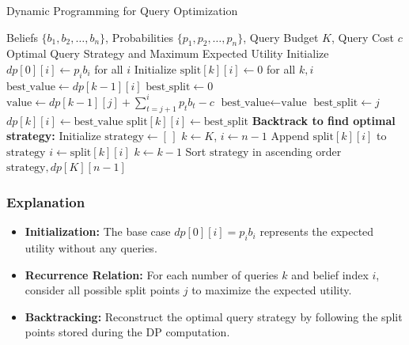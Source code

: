 \documentclass[12pt]{article}
\begin{document}
\begin{algorithm}[H]
\caption{Dynamic Programming for Query Optimization}
\label{alg:query_optimization}
\begin{algorithmic}[1]
\Require Beliefs \( \{b_1, b_2, \dots, b_n\} \), Probabilities \( \{p_1, p_2, \dots, p_n\} \), Query Budget \( K \), Query Cost \( c \)
\Ensure Optimal Query Strategy and Maximum Expected Utility
\State Initialize \( dp[0][i] \gets p_i b_i \) for all \( i \)
\State Initialize \( \text{split}[k][i] \gets 0 \) for all \( k, i \)
        \State \( \text{best\_value} \gets dp[k-1][i] \)
        \State \( \text{best\_split} \gets 0 \)
            \State \( \text{value} \gets dp[k-1][j] + \sum_{t=j+1}^{i} p_t b_t - c \)
                \State \( \text{best\_value} \gets \text{value} \)
                \State \( \text{best\_split} \gets j \)
            \EndIf
        \EndFor
        \State \( dp[k][i] \gets \text{best\_value} \)
        \State \( \text{split}[k][i] \gets \text{best\_split} \)
    \EndFor
\EndFor
\State \textbf{Backtrack to find optimal strategy:}
\State Initialize \( \text{strategy} \gets [\,] \)
\State \( k \gets K \), \( i \gets n - 1 \)
    \State Append \( \text{split}[k][i] \) to \( \text{strategy} \)
    \State \( i \gets \text{split}[k][i] \)
    \State \( k \gets k - 1 \)
\EndWhile
\State Sort \( \text{strategy} \) in ascending order
\State \Return \( \text{strategy}, dp[K][n - 1] \)
\end{algorithmic}
\end{algorithm}

\subsubsection{Explanation}

\begin{itemize}
    \item \textbf{Initialization:} The base case \( dp[0][i] = p_i b_i \) represents the expected utility without any queries.
    \item \textbf{Recurrence Relation:} For each number of queries \( k \) and belief index \( i \), consider all possible split points \( j \) to maximize the expected utility.
    \item \textbf{Backtracking:} Reconstruct the optimal query strategy by following the split points stored during the DP computation.
\end{itemize}
\end{document}
